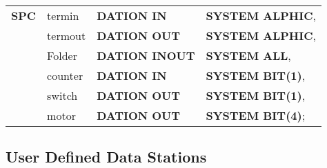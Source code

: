 \begin{tabular}{llll}
{\bf SPC} & termin  & {\bf DATION IN}    & {\bf SYSTEM ALPHIC},\\
   & termout & {\bf DATION OUT}   & {\bf SYSTEM ALPHIC},\\
   & Folder  & {\bf DATION INOUT} & {\bf SYSTEM ALL},   \\
   & counter & {\bf DATION IN}    & {\bf SYSTEM BIT(1)}, \\
   & switch  & {\bf DATION OUT}   & {\bf SYSTEM BIT(1)}, \\
   & motor   & {\bf DATION OUT}   & {\bf SYSTEM BIT(4)}; \\
\end{tabular}




\subsection{User Defined Data Stations}    %

